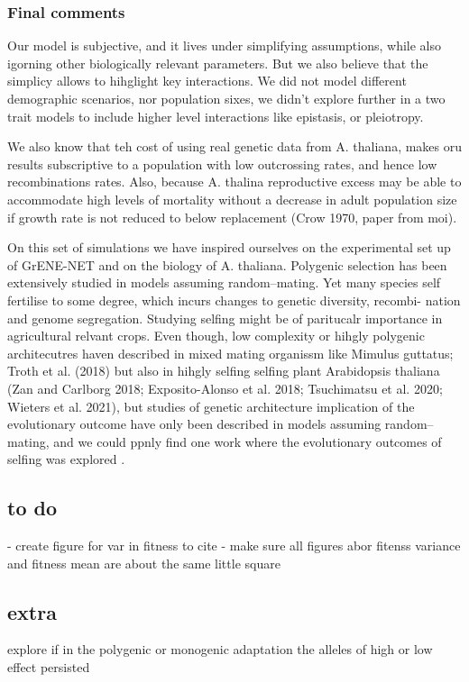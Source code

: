\documentclass{article}
\begin{document}
\subsubsection{Final comments}
Our model is subjective, and it lives under simplifying  assumptions, while also igorning other biologically relevant parameters. But we also believe that the simplicy allows to hihglight key interactions. We did not model different demographic scenarios, nor population sixes, we didn't explore further in a two trait models to include higher level interactions like epistasis, or pleiotropy. 

We also know that teh cost of using real genetic data from A. thaliana, makes oru results subscriptive to a population with low outcrossing rates, and hence low recombinations rates. Also, because A. thalina  reproductive excess may be able to accommodate high levels of mortality without a decrease in adult population size if growth rate is not reduced to below replacement (Crow 1970, paper from moi).


On this set of simulations we have inspired ourselves on the experimental set up of GrENE-NET and on the biology of A. thaliana. 
Polygenic selection has been extensively studied in models assuming random–mating. Yet many species self fertilise to some degree, which incurs changes to genetic diversity, recombi- nation and genome segregation. Studying selfing might be of paritucalr importance in agricultural relvant crops. Even though, low complexity or hihgly polygenic architecutres haven described in mixed mating organissm like Mimulus  guttatus;  Troth et  al. (2018) but also in hihgly selfing selfing plant Arabidopsis  thaliana (Zan  and  Carlborg  2018;  Exposito-Alonso et  al. 2018;  Tsuchimatsu et al. 2020; Wieters et al. 2021), but studies of genetic architecture implication of the evolutionary outcome have only been described in models assuming random–mating, and we could ppnly find one work where the evolutionary outcomes of selfing was explored \citep{Hartfield2022-nc}.




\subsection{to do}
- create figure for var in fitness to cite
- make sure all figures abor fitenss variance and fitness mean are about the same little square 

\subsection{extra}
explore if in the polygenic or monogenic adaptation the alleles of high or low effect persisted
\end{document}
